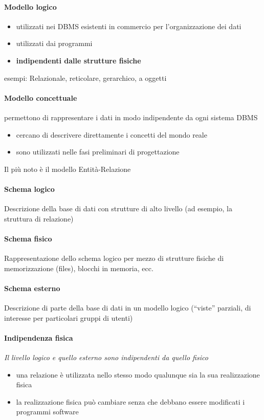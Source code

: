 \documentclass[12pt]{article}
\begin{document}
    \paragraph{Modello logico}
    \begin{itemize}
        \item utilizzati nei DBMS esistenti in commercio per l’organizzazione dei dati
        \item utilizzati dai programmi
        \item \textbf{indipendenti dalle strutture fisiche}
    \end{itemize}
	esempi: Relazionale,  reticolare, gerarchico, a oggetti
    \newpage
    \paragraph{Modello concettuale}
    permettono di rappresentare i dati in modo indipendente da ogni sistema DBMS
    \begin{itemize}
        \item cercano di descrivere direttamente i concetti del mondo reale
        \item sono utilizzati nelle fasi preliminari di progettazione
    \end{itemize}
	Il più noto è il modello Entità-Relazione
    \paragraph{Schema logico}
    Descrizione della base di dati con strutture di alto livello (ad esempio, la struttura di relazione)
    \paragraph{Schema fisico}
    Rappresentazione dello schema logico per mezzo di strutture fisiche di memorizzazione (files), blocchi in memoria, ecc.
    \paragraph{Schema esterno}
    Descrizione di parte della base di dati in un modello logico (“viste” parziali, di interesse per particolari gruppi di utenti)
    \paragraph{Indipendenza fisica}
    \textit{Il livello logico e quello esterno sono indipendenti da quello fisico}
    \begin{itemize}
        \item una relazione è utilizzata nello stesso modo qualunque sia la sua realizzazione fisica
        \item la realizzazione fisica può cambiare senza che debbano essere modificati i programmi software
    \end{itemize}
\end{document}
